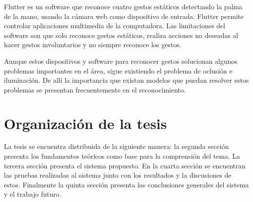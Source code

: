 Flutter  es un software que reconoce cuatro gestos est\'aticos detectando la palma de la mano, usando la c\'amara web como dispositivo de entrada. Flutter permite controlar aplicaciones multimedia de la computadora. 	Las limitaciones del software son que solo reconoce gestos est\'aticos, realiza acciones no deseadas al hacer gestos involuntarios y no siempre reconoce los gestos. 

Aunque estos dispositivos y software para reconocer gestos  solucionan algunos problemas importantes en el \'area, sigue existiendo el problema de oclusi\'on  e iluminaci\'on. De allí la importancia que existan modelos que puedan resolver estos problemas se presentan frecuentemente en el reconocimiento. 

\section{Organizaci\'on de la tesis}\label{OrganizacionTesis}
La tesis se encuentra distribuida de la siguiente manera: la segunda sección presenta los fundamentos teóricos como base para la comprensión del tema. La tercera sección presenta el sistema propuesto. En la cuarta sección se encuentran las pruebas realizadas al sistema junto con los resultados y la discusiones de estos. Finalmente la quinta sección presenta las conclusiones generales del sistema y el trabajo futuro. 
	



\newpage









